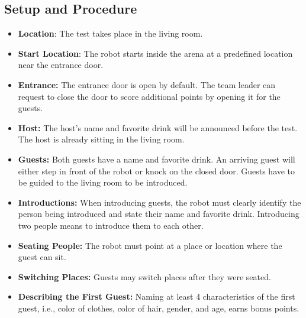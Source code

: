 \subsection*{Setup and Procedure}
\begin{itemize}
	\item \textbf{Location}: The test takes place in the living room.
	
	\item \textbf{Start Location}: The robot starts inside the arena at a predefined location near the entrance door.
	
	\item \textbf{Entrance:} The entrance door is open by default. The team leader can request to close the door to score additional points by opening it for the guests.

	\item \textbf{Host:} The host's name and favorite drink will be announced before the test. The host is already sitting in the living room.

	\item \textbf{Guests:} Both guests have a name and favorite drink. An arriving guest will either step in front of the robot or knock on the closed door. Guests have to be guided to the living room to be introduced.

	\item \textbf{Introductions:} When introducing guests, the robot must clearly identify the person being introduced and state their name and favorite drink. Introducing two people means to introduce them to each other.
	
	\item \textbf{Seating People:} The robot must point at a place or location where the guest can sit.
	
	\item \textbf{Switching Places:} Guests may switch places after they were seated.
	
	\item \textbf{Describing the First Guest:} Naming at least 4 characteristics of the first guest, i.e., color of clothes, color of hair, gender, and age, earns bonus points.
\end{itemize}


